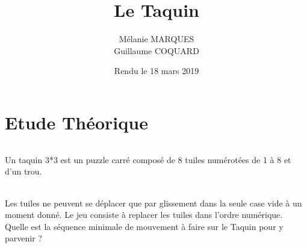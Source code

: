 \documentclass[10pt,a4paper]{report}
\title{Le Taquin}
\author{Mélanie MARQUES \\ Guillaume COQUARD}
\date{Rendu le 18 mars 2019}
\begin{document}
\begin{titlepage}
	\maketitle
\end{titlepage}


\part{Etude Théorique}

\paragraph{}{Un taquin 3*3 est un puzzle carré composé de 8 tuiles numérotées de 1 à 8 et d’un trou.}

\paragraph*{}{Les tuiles ne peuvent se déplacer que par glissement dans la seule case vide à un moment donné. Le jeu consiste à replacer les tuiles dans l’ordre numérique. Quelle est la séquence minimale de mouvement à faire sur le Taquin pour y parvenir ?}
\end{document}
